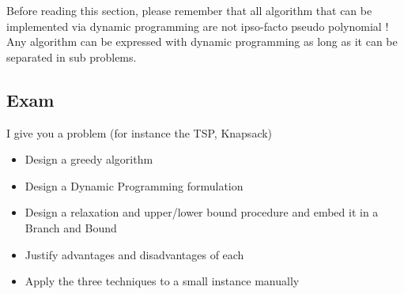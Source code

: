 Before reading this section, please remember that all algorithm that can be
implemented via dynamic programming are not ipso-facto pseudo polynomial ! Any
algorithm can be expressed with dynamic programming as long as it can be separated in
sub problems.



\subsection{Exam}
I give you a problem (for instance the TSP, Knapsack)
\begin{itemize}
    \item  Design a greedy algorithm
    \item  Design a Dynamic Programming formulation
    \item  Design a relaxation and upper/lower bound
        procedure and embed it in a Branch and Bound
    \item  Justify advantages and disadvantages of each
    \item  Apply the three techniques to a small instance
        manually
\end{itemize}
